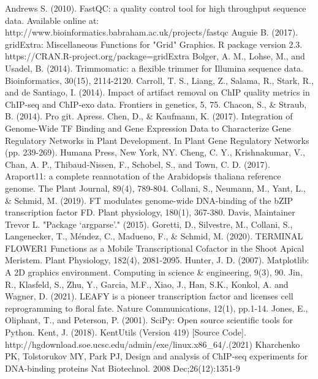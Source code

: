 \documentclass{article}
\begin{document}
\begin{sloppypar}
\begin{thebibliography}{9}
Andrews S. (2010). FastQC: a quality control tool for high throughput sequence data. Available online at: http://www.bioinformatics.babraham.ac.uk/projects/fastqc
Auguie B. (2017). gridExtra: Miscellaneous Functions for "Grid" Graphics. R package version 2.3. https://CRAN.R-project.org/package=gridExtra
Bolger, A. M., Lohse, M., and Usadel, B. (2014). Trimmomatic: a flexible trimmer for Illumina sequence data. Bioinformatics, 30(15), 2114-2120.
Carroll, T. S., Liang, Z., Salama, R., Stark, R., and de Santiago, I. (2014). Impact of artifact removal on ChIP quality metrics in ChIP-seq and ChIP-exo data. Frontiers in genetics, 5, 75.
Chacon, S., & Straub, B. (2014). Pro git. Apress.
Chen, D., \& Kaufmann, K. (2017). Integration of Genome-Wide TF Binding and Gene Expression Data to Characterize Gene Regulatory Networks in Plant Development. In Plant Gene Regulatory Networks (pp. 239-269). Humana Press, New York, NY.
Cheng, C. Y., Krishnakumar, V., Chan, A. P., Thibaud‐Nissen, F., Schobel, S., and Town, C. D. (2017). Araport11: a complete reannotation of the Arabidopsis thaliana reference genome. The Plant Journal, 89(4), 789-804.
Collani, S., Neumann, M., Yant, L., \& Schmid, M. (2019). FT modulates genome-wide DNA-binding of the bZIP transcription factor FD. Plant physiology, 180(1), 367-380.
Davis, Maintainer Trevor L. "Package ‘argparse’." (2015).
Goretti, D., Silvestre, M., Collani, S., Langenecker, T., Méndez, C., Madueno, F., 
\& Schmid, M. (2020). TERMINAL FLOWER1 Functions as a Mobile Transcriptional Cofactor in the Shoot Apical Meristem. Plant Physiology, 182(4), 2081-2095.
Hunter, J. D. (2007). Matplotlib: A 2D graphics environment. Computing in science \& engineering, 9(3), 90.
Jin, R., Klasfeld, S., Zhu, Y., Garcia, M.F., Xiao, J., Han, S.K., Konkol, A. and Wagner, D. (2021). LEAFY is a pioneer transcription factor and licenses cell reprogramming to floral fate. Nature Communications, 12(1), pp.1-14.
Jones, E., Oliphant, T., and Peterson, P. (2001). SciPy: Open source scientific tools for Python.
Kent, J. (2018). KentUtils (Version 419) [Source Code]. http://hgdownload.soe.ucsc.edu/admin/exe/linux.x86\_64/.(2021)
Kharchenko PK, Tolstorukov MY, Park PJ, Design and analysis of ChIP-seq experiments for DNA-binding proteins Nat Biotechnol. 2008 Dec;26(12):1351-9

\end{thebibliography}
\end{sloppypar}
\end{document}
